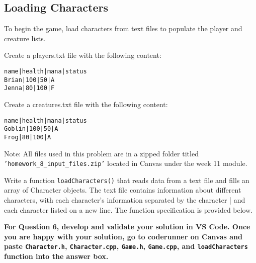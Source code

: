 \begin{longtable}{|p{1.7in}|p{4.3in}|}
\vspace{5pt} \\ \hline
\end{longtable}



\subsection{Loading Characters}

To begin the game, load characters from text files to populate the player and creature lists.

Create a players.txt file with the following content:

\begin{verbatim}
name|health|mana|status
Brian|100|50|A
Jenna|80|100|F
\end{verbatim}


Create a creatures.txt file with the following content:

\begin{verbatim}
name|health|mana|status
Goblin|100|50|A
Frog|80|100|A
\end{verbatim}

Note: All files used in this problem are in a zipped folder titled \texttt{'homework\_8\_input\_files.zip'} located in Canvas under the week 11 module. \newline

Write a function \texttt{loadCharacters()} that reads data from a text file and fills an array of Character objects. The text file contains information about different characters, with each character's information separated by the character | and each character listed on a new line. The function specification is provided below. \newline



\textbf{For Question 6, develop and validate your solution in VS Code. Once you are happy with your solution, go to coderunner on Canvas and paste \texttt{Character.h}, \texttt{Character.cpp}, \texttt{Game.h}, \texttt{Game.cpp}, and \texttt{loadCharacters} function into the answer box.} 

